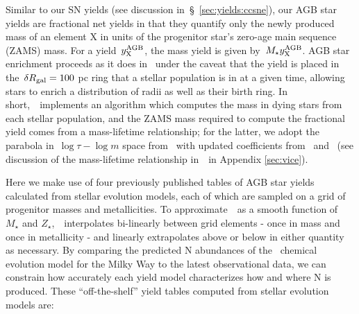 \documentclass[ms.tex]{subfiles}
\begin{document}
Similar to our SN yields (see discussion in~\S~\ref{sec:yields:ccsne}), our
AGB star yields are fractional net yields in that they quantify only the newly
produced mass of an element X in units of the progenitor star's zero-age main
sequence (ZAMS) mass.
For a yield~$y_\text{X}^\text{AGB}$, the mass yield is given by~$M_\star y_\text{X}^\text{AGB}$.
AGB star enrichment proceeds as it does in~\citet{Johnson2020} under the caveat
that the yield is placed in the~$\delta R_\text{gal} = 100$ pc ring that a stellar
population is in at a given time, allowing stars to enrich a distribution of
radii as well as their birth ring.
In short,~\vice~implements an algorithm which computes the mass in dying stars
from each stellar population, and the ZAMS mass required to compute the
fractional yield comes from a mass-lifetime relationship; for the latter, we
adopt the parabola in~$\log\tau - \log m$ space from~\citet{Larson1974} with
updated coefficients from~\citet{Kobayashi2004} and~\citet*{David1990} (see
discussion of the mass-lifetime relationship in~\vice~in Appendix
\ref{sec:vice}).
\par
Here we make use of four previously published tables of AGB star yields
calculated from stellar evolution models, each of which are sampled on a grid
of progenitor masses and metallicities.
To approximate~~as a smooth function of~$M_\star$ and
$Z_\star$,~\vice~interpolates bi-linearly between grid elements - once in
mass and once in metallicity - and linearly extrapolates above or below in
either quantity as necessary.
By comparing the predicted N abundances of the~\citet{Johnson2021} chemical
evolution model for the Milky Way to the latest observational data, we can
constrain how accurately each yield model characterizes how and where N is
produced.
These ``off-the-shelf'' yield tables computed from stellar evolution models are:
\end{document}
